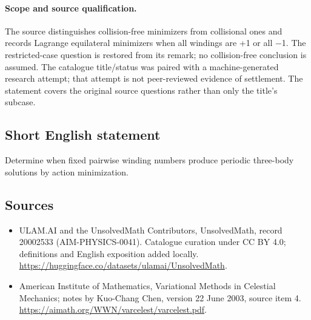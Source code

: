 \documentclass[11pt]{article}
\begin{document}
\paragraph{Scope and source qualification.}The source distinguishes collision-free minimizers from collisional ones and records Lagrange equilateral minimizers when all windings are +1 or all −1. The restricted-case question is restored from its remark; no collision-free conclusion is assumed. The catalogue title/status was paired with a machine-generated research attempt; that attempt is not peer-reviewed evidence of settlement. The statement covers the original source questions rather than only the title’s subcase.
\subsection{Short English statement}
Determine when fixed pairwise winding numbers produce periodic three-body solutions by action minimization.
\subsection{Sources}
\begin{itemize}
\item[\hypertarget{source:20002533:1}{S1}] ULAM.AI and the UnsolvedMath Contributors, UnsolvedMath, record 20002533 (AIM-PHYSICS-0041). Catalogue curation under CC BY 4.0; definitions and English exposition added locally.
\url{https://huggingface.co/datasets/ulamai/UnsolvedMath}.
\item[\hypertarget{source:20002533:2}{S2}] American Institute of Mathematics, Variational Methods in Celestial Mechanics; notes by Kuo-Chang Chen, version 22 June 2003, source item 4.
\url{https://aimath.org/WWN/varcelest/varcelest.pdf}.
\end{itemize}
\label{end:20002533}
\end{document}
